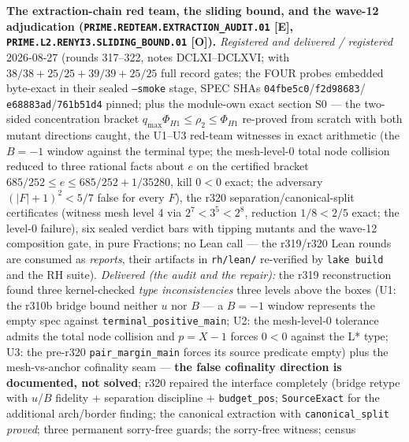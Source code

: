 \par\smallskip\noindent\textbf{The extraction-chain red team, the
sliding bound, and the wave-12 adjudication
(\texttt{PRIME.REDTEAM.\allowbreak EXTRACTION\_AUDIT.01} [E],
\texttt{PRIME.L2.\allowbreak RENYI3.\allowbreak SLIDING\_BOUND.01}
[O]).}
{\sloppy
\emph{Registered and delivered / registered} 2026-08-27 (rounds
317--322, notes DCLXI--DCLXVI;
 with $38/38 + 25/25 + 39/39 +
25/25$ full record gates; the FOUR probes embedded byte-exact in
their sealed \texttt{--smoke} stage, SPEC SHAs
\texttt{04fbe5c0}/\allowbreak\texttt{f2d98683}/\allowbreak
\texttt{e68883ad}/\allowbreak\texttt{761b51d4} pinned; plus the
module-own exact section S0 --- the two-sided concentration
bracket $q_{\max}\Phi_{H1} \le \rho_2 \le \Phi_{H1}$ re-proved
from scratch with both mutant directions caught, the U1--U3
red-team witnesses in exact arithmetic (the $B = -1$ window
against the terminal type; the mesh-level-0 total node collision
reduced to three rational facts about $e$ on the certified bracket
$685/252 \le e \le 685/252 + 1/35280$, kill $0 < 0$ exact; the
adversary $(|F|+1)^2 < 5/7$ false for every $F$), the r320
separation/canonical-split certificates (witness mesh level 4 via
$2^7 < 3^5 < 2^8$, reduction $1/8 < 2/5$ exact; the level-0
failure), six sealed verdict bars with tipping mutants and the
wave-12 composition gate, in pure Fractions; no Lean call --- the
r319/r320 Lean rounds are consumed as \emph{reports}, their
artifacts in \texttt{rh/lean/} re-verified by \texttt{lake build}
and the RH suite).  \emph{Delivered (the audit and the repair):}
the r319 reconstruction found three kernel-checked \emph{type
inconsistencies} three levels above the boxes (U1: the r310b
bridge bound neither $u$ nor $B$ --- a $B = -1$ window represents
the empty spec against \texttt{terminal\_positive\_main}; U2: the
mesh-level-0 tolerance admits the total node collision and
$p = X - 1$ forces $0 < 0$ against the L* type; U3: the pre-r320
\texttt{pair\_margin\_main} forces its source predicate empty)
plus the mesh-vs-anchor cofinality seam --- \textbf{the false
cofinality direction is documented, not solved}; r320 repaired the
interface completely (bridge retype with $u$/$B$ fidelity $+$
separation discipline $+$ \texttt{budget\_pos};
\texttt{SourceExact} for the additional arch/border finding; the
canonical extraction with \texttt{canonical\_split} \emph{proved};
three permanent sorry-free guards; the sorry-free witness; census
}

